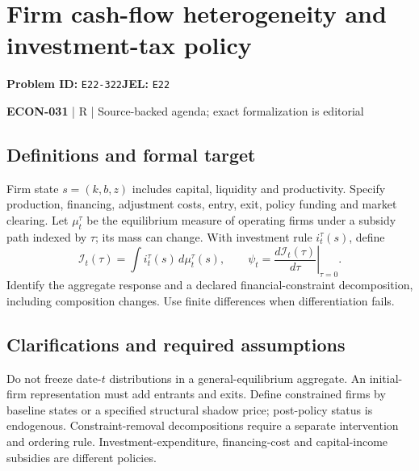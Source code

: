 \documentclass[11pt,a4paper]{article}
\begin{document}
\section*{Firm cash-flow heterogeneity and investment-tax policy}
\textbf{Problem ID:} \texttt{E22-322}\quad \textbf{JEL:} \texttt{E22}\par
\label{problem:OP-0610}


\label{audited:ECON-031}

{\sffamily\small\color{muted}\textbf{ECON-031} | R | Source-backed agenda; exact formalization is editorial\par}

\subsection*{Definitions and formal target}

Firm state \(s=(k,b,z)\) includes capital, liquidity and productivity. Specify production, financing, adjustment costs, entry, exit, policy funding and market clearing. Let \(\mu_t^\tau\) be the equilibrium measure of operating firms under a subsidy path indexed by \(\tau\); its mass can change. With investment rule \(i_t^\tau(s)\), define
\[
 \mathcal I_t(\tau)=\int i_t^\tau(s)\,d\mu_t^\tau(s),\qquad
 \psi_t=\left.\frac{d\mathcal I_t(\tau)}{d\tau}\right|_{\tau=0}.
\]
Identify the aggregate response and a declared financial-constraint decomposition, including composition changes. Use finite differences when differentiation fails.

\subsection*{Clarifications and required assumptions}

Do not freeze date-\(t\) distributions in a general-equilibrium aggregate. An initial-firm representation must add entrants and exits. Define constrained firms by baseline states or a specified structural shadow price; post-policy status is endogenous. Constraint-removal decompositions require a separate intervention and ordering rule. Investment-expenditure, financing-cost and capital-income subsidies are different policies.
\end{document}
